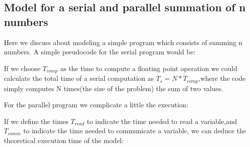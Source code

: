 \documentclass[11pt]{scrartcl} %
\begin{document}
\subsection{Model for a serial and parallel summation of n numbers}
Here we discuss about modeling a simple program which consists of summing n numbers.
A simple pseudocode for the serial program would be:


\begin{algorithmic}

  \ENDFOR
{}
\end{algorithmic}

If we choose $T_{comp}$ as the time to compute a floating point operation we could calculate the total time of a serial computation as
$T_s = N * T_{comp}$,where the code simply computes N times(the size of the problem) the sum of two values.

For the parallel program we complicate a little the execution:

\begin{algorithmic}


		  \ENDFOR
		  \ENDFOR
\ENDIF
{}
	  \ENDFOR
\ENDIF
{}
\end{algorithmic}

If we define the times $T_{read}$ to indicate the time needed to read a variable,and $T_{comm}$ to indicate the time needed to communicate a variable, we can deduce the theoretical execution time of the model:
\  
\begin{algorithmic}
\end{algorithmic}
\ 
\begin{algorithmic}
\end{algorithmic}
\ 
\end{document}
